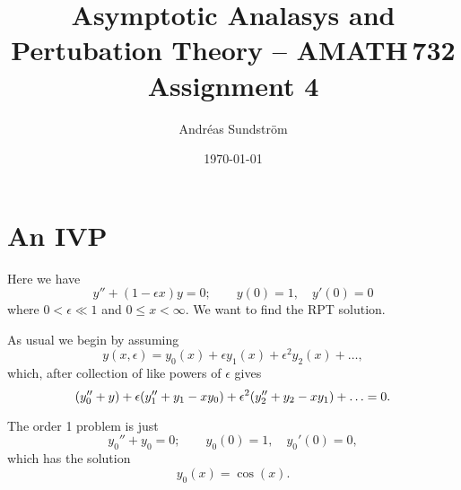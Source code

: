 \documentclass[11pt,letter, swedish, english
]{article}
\begin{document}
\title{Asymptotic Analasys and Pertubation Theory -- AMATH\,732 \\
Assignment 4}
\author{Andréas Sundström}
\date{\today}

\maketitle



\section{An IVP}
Here we have
\begin{equation}\label{eq:1_IVP}
y''+(1-\epsilon x)y=0;\qquad
y(0)=1,\quad y'(0)=0
\end{equation}
where $0<\epsilon\ll1$ and $0\le x<\infty$. We want to find the RPT
solution. 

As usual we begin by assuming
\begin{equation}
y(x, \epsilon)=y_0(x) + \epsilon y_1(x) + \epsilon^2 y_2(x)+\ldots,
\end{equation}
which, after collection of like powers of $\epsilon$ gives
\begin{equation}
\qty(y_0''+y) +\epsilon\qty(y_1''+y_1-xy_0) 
+\epsilon^2\qty(y_2''+y_2-xy_1) +\ldots=0.
\end{equation}

The order 1 problem is just
\begin{equation}
y_0''+y_0=0;\qquad
y_0(0)=1,\quad y_0'(0)=0,
\end{equation}
which has the solution
\begin{equation}
y_0(x)=\cos(x).
\end{equation}
\end{document}

